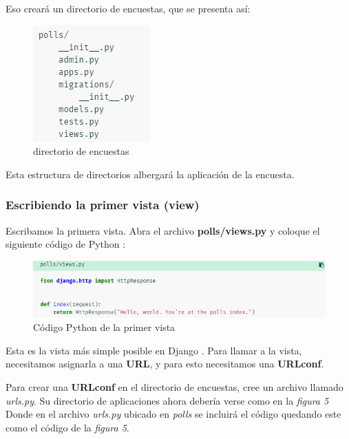 \documentclass[10pt]{article}
\newcommand{\py}[1]{{\textcolor{B}{Python} #1}}
\newcommand{\django}[1]{{\textcolor{G}{Django} #1}}
\begin{document}
Eso creará un directorio de encuestas, que se presenta así:

\begin{figure}[H]
  \begin{center}
  	 \includegraphics{figuras/313/img1.png}	 
	 \renewcommand{\arraystretch}{1.3}
	 \caption{directorio de encuestas}
  \end{center}
\end{figure}


Esta estructura de directorios albergará la aplicación de la encuesta.

\subsubsection{Escribiendo la primer vista (view)}

Escribamos la primera vista. Abra el archivo \textbf{polls/views.py} y coloque el siguiente código de \py{}:

\begin{figure}[H]
  \begin{center}
  	 \includegraphics{figuras/314/img1.png}	 
	 \renewcommand{\arraystretch}{1.3}
	 \caption{Código \py{} de la primer vista}
  \end{center}
\end{figure}


Esta es la vista más simple posible en \django{}. Para llamar a la vista, necesitamos asignarla a una \textbf{URL}, y para esto necesitamos una \textbf{URLconf}.

Para crear una \textbf{URLconf} en el directorio de encuestas, cree un archivo llamado \textit{urls.py}. Su directorio de aplicaciones ahora debería verse como en la \textit{figura 5}
Donde en el archivo \textit{urls.py} ubicado en \textit{polls} se incluirá el código quedando este como el código de la \textit{figura 5}.
\end{document}
